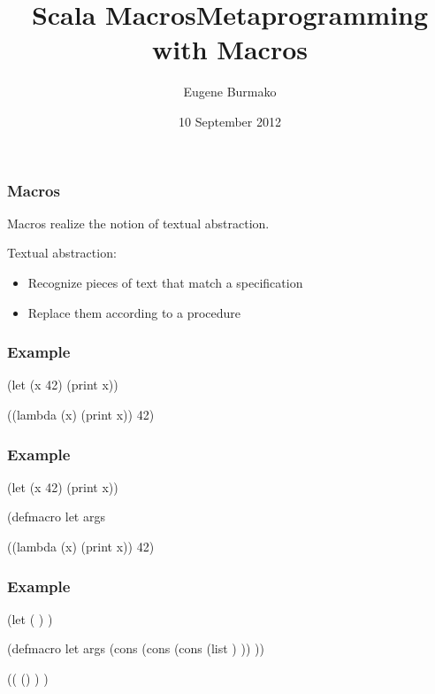 \documentclass[hyperref={bookmarks=false}]{beamer}
\title{Scala Macros}
\begin{document}
\title{Metaprogramming with Macros}
\author{Eugene Burmako}
\date{10 September 2012}
{
\begin{frame}
  \titlepage
\end{frame}
}

\begin{frame}[fragile]
\frametitle{Macros}
\pause
Macros realize the notion of textual abstraction.

\pause
Textual abstraction:
\begin{itemize}
\item Recognize pieces of text that match a specification
\item Replace them according to a procedure
\end{itemize}
\end{frame}

\begin{frame}[fragile]
\frametitle{Example}
\begin{semiverbatim}
(let (x 42) (print x))








((lambda (x) (print x)) 42)
\end{semiverbatim}
\end{frame}

\begin{frame}[fragile]
\frametitle{Example}
\begin{semiverbatim}
(let (x 42) (print x))

(defmacro let args

((lambda (x) (print x)) 42)
\end{semiverbatim}
\end{frame}

\begin{frame}[fragile]
\frametitle{Example}
\begin{semiverbatim}
(let (\text{\color{red}{x}} \text{\color{teal}{42}}) \text{\color{violet}{(print x)}})

(defmacro let args
  (cons
   (cons \text{\color{blue}{'lambda}}
         (cons (list \text{\color{red}{(caar args)}})
               \text{\color{violet}{(cdr args)}}))
   \text{\color{teal}{(cdar args)}}))

((\text{\color{blue}{lambda}} (\text{\color{red}{x}}) \text{\color{violet}{(print x)}}) \text{\color{teal}{42}})
\end{semiverbatim}
\end{frame}
\end{document}
